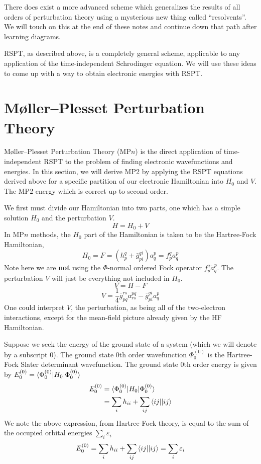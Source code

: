 \documentclass{article}
\newcommand{\eps}{\varepsilon}
\begin{document}
There does exist a more advanced scheme which generalizes the results of all orders of perturbation theory using a mysterious new thing called ``resolvents''.
We will touch on this at the end of these notes and continue down that path after learning diagrams. 

RSPT, as described above, is a completely general scheme, applicable to any application of the time-independent Schrodinger equation.
We will use these ideas to come up with a way to obtain electronic energies with RSPT. 

\section{M{\o}ller--Plesset Perturbation Theory}
M{\o}ller--Plesset Perturbation Theory (MP$n$) is the direct application of time-independent RSPT to the problem of finding electronic wavefunctions and energies.
In this section, we will derive MP2 by applying the RSPT equations derived above for a specific partition of our electronic Hamiltonian into $H_0$ and $V$.
The MP2 energy which is correct up to second-order.

We first must divide our Hamiltonian into two parts, one which has a simple solution $H_0$ and the perturbation $V$.
\[H = H_0 + V \]
In MP$n$ methods, the $H_0$ part of the Hamiltonian is taken to be the Hartree-Fock Hamiltonian,
\[H_0 = F = (h_p^q + \bar{g}_{pi}^{qi}) a_q^p = f_p^q a_q^p  \]
Note here we are \textbf{not} using the $\Phi$-normal ordered Fock operator $f_p^q \tilde{a}_q^p$.
The perturbation $V$ will just be everything not included in $H_0$. 
\[V = H - F \]
\[V =  \frac{1}{4} \bar{g}_{pq}^{rs} a_{rs}^{pq} - \bar{g}_{pi}^{qi} a_{q}^{p}  \]
One could interpret $V$, the perturbation, as being all of the two-electron interactions, except for the mean-field picture already given by the HF Hamiltonian.

Suppose we seek the energy of the ground state of a system (which we will denote by a subscript 0).
The ground state 0th order wavefunction $\Phi_0^{(0)}$ is the Hartree-Fock Slater determinant wavefunction. 
The ground state 0th order energy is given by $E_0^{(0)} = \braket{\Phi_0^{(0)} | H_0 | \Phi_0^{(0)}}$
\begin{align*}
E_0^{(0)} &= \braket{\Phi_0^{(0)} | H_0 | \Phi_0^{(0)}} \\
          &= \sum_i h_{ii} + \sum_{ij} \braket{ij||ij}  
\end{align*}
We note the above expression, from Hartree-Fock theory, is equal to the sum of the occupied orbital energies $\sum_i \eps_i$
\[E_0^{(0)} = \sum_i h_{ii} + \sum_{ij} \braket{ij||ij} = \sum_i \eps_i  \]
\end{document}
